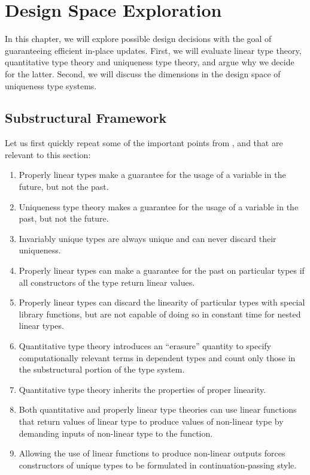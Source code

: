 \chapter{Design Space Exploration}\label{sec:designspace}
In this chapter, we will explore possible design decisions with the goal of guaranteeing efficient in-place updates. First, we will evaluate linear type theory, quantitative type theory and uniqueness type theory, and argue why we decide for the latter. Second, we will discuss the dimensions in the design space of uniqueness type systems.

\section{Substructural Framework}
Let us first quickly repeat some of the important points from ,  and  that are relevant to this section:
\begin{enumerate}
	\item Properly linear types make a guarantee for the usage of a variable in the future, but not the past.
	\item Uniqueness type theory makes a guarantee for the usage of a variable in the past, but not the future.
	\item Invariably unique types are always unique and can never discard their uniqueness.
	\item Properly linear types can make a guarantee for the past on particular types if all constructors of the type return linear values.
	\item Properly linear types can discard the linearity of particular types with special library functions, but are not capable of doing so in constant time for nested linear types.
	\item Quantitative type theory introduces an ``erasure'' quantity to specify computationally relevant terms in dependent types and count only those in the substructural portion of the type system.
	\item Quantitative type theory inherits the properties of proper linearity.
	\item Both quantitative and properly linear type theories can use linear functions that return values of linear type to produce values of non-linear type by demanding inputs of non-linear type to the function.
	\item Allowing the use of linear functions to produce non-linear outputs forces constructors of unique types to be formulated in continuation-passing style.
\end{enumerate}

